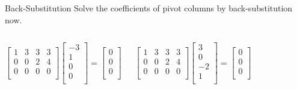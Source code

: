\documentclass{beamer}
\begin{document}
\begin{frame}{Back-Substitution}
Solve the coefficients of pivot columns by back-substitution now.

\vspace{-8pt}
\begin{columns}
    \begin{equation*}
        \left[ \begin{matrix}
            1&		3&		3&		3\\
            0&		0&		2&		4\\
            0&		0&		0&		0\\
        \end{matrix} \right] \left[ \begin{array}{c}
            -3\\
            1\\
            0\\
            0\\
        \end{array} \right] =\left[ \begin{array}{c}
            0\\
            0\\
            0\\
        \end{array} \right]
    \end{equation*}

    \begin{equation*}
        \left[ \begin{matrix}
            1&		3&		3&		3\\
            0&		0&		2&		4\\
            0&		0&		0&		0\\
        \end{matrix} \right] \left[ \begin{array}{c}
            3\\
            0\\
            -2\\
            1\\
        \end{array} \right] =\left[ \begin{array}{c}
            0\\
            0\\
            0\\
        \end{array} \right]
    \end{equation*}
\end{columns}

\end{frame}
\end{document}
